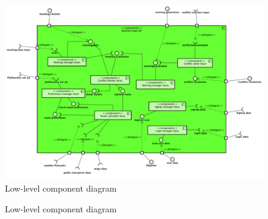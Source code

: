 
\begin{figure}
	\centering
	\includegraphics[width=1.3\textwidth]{images/LLcomponentdiagram}
	\caption{Low-level component diagram}
	\label{fig:llcomponentdiagram}
\end{figure}


\begin{figure} 
\begin{center}

\caption{Low-level component diagram} 
\label{fig:llcomponentdiagram} 


\end{center}
\end{figure} 